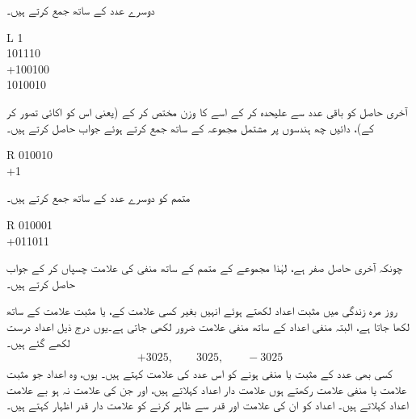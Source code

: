 دوسرے عدد کے ساتھ جمع کرتے ہیں۔
 \begin{center}
\begin{otherlanguage}{english}
\begin{tabular}{L}
\phantom{1}1\\
\phantom{+}101110\\
+100100\\
\midrule
\phantom{\,\,}1010010
\end{tabular}
\end{otherlanguage}
\end{center}
آخری حاصل  کو باقی عدد سے علیحدہ کر کے اسے  کا وزن مختص کر کے (یعنی اس کو اکائی تصور کر کے)، دائیں چھ ہندسوں پر مشتمل مجموعہ  کے ساتھ جمع کرتے ہوئے جواب حاصل کرتے ہیں۔
 \begin{center}
\begin{otherlanguage}{english}
\begin{tabular}{R}
010010\\
+1\\
\end{tabular}
\end{otherlanguage}
\end{center}
متمم  کو دوسرے عدد کے ساتھ جمع کرتے ہیں۔
 \begin{center}
\begin{otherlanguage}{english}
\begin{tabular}{R}
010001\\
+011011\\
\end{tabular}
\end{otherlanguage}
\end{center}
چونکہ آخری حاصل صفر ہے، لہٰذا مجموعے کے متمم  کے ساتھ منفی کی علامت چسپاں کر کے جواب  حاصل کرتے ہیں۔
 
 
روز مرہ زندگی میں مثبت اعداد لکھتے ہوئے انہیں بغیر کسی علامت کے، یا مثبت علامت  کے ساتھ لکھا جاتا ہے، البتہ منفی اعداد کے ساتھ منفی علامت  ضرور لکھی جاتی ہے۔یوں درج ذیل اعداد درست لکھے گئے ہیں۔
\begin{align*}
+3025, \quad \quad 3025, \quad \quad -3025
\end{align*}
کسی بھی عدد کے مثبت یا منفی ہونے کو اس عدد کی علامت کہتے ہیں۔ یوں، وہ اعداد جو مثبت علامت  یا منفی علامت  رکھتے ہوں علامت دار اعداد کہلاتے ہیں، اور جن کی علامت نہ ہو بے علامت اعداد کہلاتے ہیں۔ اعداد کو ان کی علامت اور قدر سے ظاہر کرنے کو علامت دار قدر اظہار کہتے ہیں۔ 

